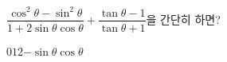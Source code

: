 $\dfrac{\cos^2\theta-\sin^2\theta}{1+2\sin\theta\cos\theta}+\dfrac{\tan\theta-1}{\tan\theta+1}$을 간단히 하면?
\begin{choices32}{$0$}{$1$}{$2$}{$-\sin\theta$}{$\cos\theta$}\end{choices32}
